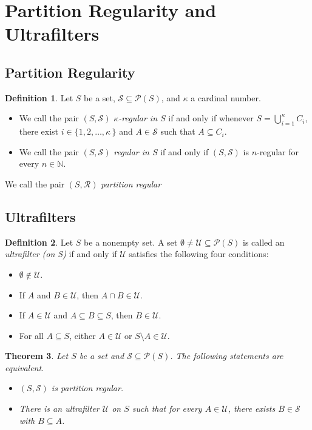\documentclass[12pt]{article}
\theoremstyle{plain}
\newtheorem{thm}{Theorem}[section]
\theoremstyle{definition}
\newtheorem{defn}[thm]{Definition}
\newcommand{\bbN}{\mathbb{N}}
\newcommand{\calP}{\mathcal{P}}
\newcommand{\calR}{\mathcal{R}}
\newcommand{\calS}{\mathcal{S}}
\newcommand{\calU}{\mathcal{U}}
\begin{document}
\section{Partition Regularity and Ultrafilters}
\subsection{Partition Regularity}
\begin{defn}
  Let $S$ be a set, $\calS \subseteq \calP(S)$, and $\kappa$ a cardinal
  number. 
  \begin{itemize}
    \item[(a)] We call the pair $(S, \calS)$
      \textsl{\mbox{$\kappa$-regular} in $S$} if and only if whenever
      $S = \bigcup_{i=1}^\kappa C_i$, there exist $i \in \{1, 2,
      \ldots, \kappa \,\}$ and $A \in \calS$ such that $A \subseteq
      C_i$.

    \item[(b)] We call the pair $(S, \calS)$ \textsl{regular in $S$}
      if and only if $(S, \calS)$ is \mbox{$n$-regular} for every $n
      \in \bbN$.
  \end{itemize}
  We call the pair $(S, \calR)$ \textsl{partition regular}
\end{defn}

\subsection{Ultrafilters}
\begin{defn}
  Let $S$ be a nonempty set.
  A set $\emptyset \ne \calU \subseteq \calP(S)$ is called an
  \textsl{ultrafilter (on S)} if and only if $\calU$ satisfies the
  following four conditions:
  \begin{itemize}
    \item[(1)] $\emptyset \not\in \calU$.
    \item[(2)] If $A$ and $B \in \calU$, then $A \cap B \in \calU$.
    \item[(3)] If $A \in \calU$ and $A \subseteq B \subseteq S$, then $B
      \in \calU$.
    \item[(4)] For all $A \subseteq S$, either $A \in \calU$ or $S
      \setminus A \in \calU$. 
  \end{itemize}
\end{defn}

\begin{thm}
  Let $S$ be a set and $\calS \subseteq \calP(S)$.
  The following statements are equivalent.
  \begin{itemize}
    \item[(a)] $(S, \calS)$ is partition regular.

    \item[(b)] There is an ultrafilter $\calU$ on $S$ such that for
      every $A \in \calU$, there exists $B \in \calS$ with $B
      \subseteq A$.
  \end{itemize}
\end{thm}
\end{document}
